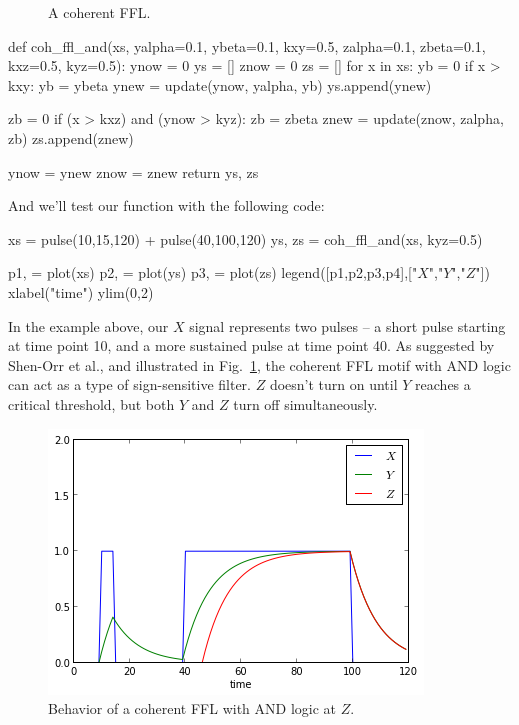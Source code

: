\begin{figure}[!ht]
\centering
\caption{A coherent FFL.}
\end{figure}
%
\begin{python}
def coh_ffl_and(xs, yalpha=0.1, ybeta=0.1, kxy=0.5, zalpha=0.1, zbeta=0.1, kxz=0.5, kyz=0.5):
    ynow = 0
    ys = []
    znow = 0
    zs = []
    for x in xs:
        yb = 0
        if x > kxy:
            yb = ybeta
        ynew = update(ynow, yalpha, yb)
        ys.append(ynew)

        zb = 0
        if (x > kxz) and (ynow > kyz):
            zb = zbeta
        znew = update(znow, zalpha, zb)
        zs.append(znew)

        ynow = ynew
        znow = znew
    return ys, zs
\end{python}
%
And we'll test our function with the following code:
%
\begin{python}
xs = pulse(10,15,120) + pulse(40,100,120)
ys, zs = coh_ffl_and(xs, kyz=0.5)

p1, = plot(xs)
p2, = plot(ys)
p3, = plot(zs)
legend([p1,p2,p3,p4],["$X$","$Y$","$Z$"])
xlabel("time")
ylim(0,2)
\end{python}
%
In the example above, our $X$ signal represents two pulses -- a short pulse starting at time point 10, and a more sustained pulse at time point 40. As suggested by Shen-Orr et al., and illustrated in Fig.~\ref{fig:cohffland}, the coherent FFL motif with AND logic can act as a type of sign-sensitive filter.  $Z$ doesn't turn on until $Y$ reaches a critical threshold, but both $Y$ and $Z$ turn off simultaneously.
%
\begin{figure}[!ht]
    \centering
    \includegraphics[width=0.33\columnwidth]{./figures/hands-on12/fig-cohffland.png}
    \caption{Behavior of a coherent FFL with AND logic at $Z$.}\label{fig:cohffland}
\end{figure}


